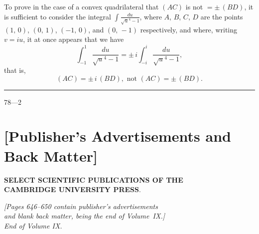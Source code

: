 \documentclass[12pt,a4paper]{article}
\begin{document}
To prove in the case of a convex quadrilateral that $(AC)$ is not $= \pm\,(BD)$, it is sufficient to consider the integral $\displaystyle\int\!\frac{du}{\surd u^4-1}$, where $A$, $B$, $C$, $D$ are the points $(1,\,0)$, $(0,\,1)$, $(-1,\,0)$, and $(0,\,-1)$ respectively, and where, writing $v = iu$, it at once appears that we have
\[
\int_{-1}^{1}\frac{du}{\surd u^4-1} = \pm\,i\int_{-i}^{i}\frac{du}{\surd u^4-1},
\]
that is,
\[
(AC) = \pm\,i\,(BD), \text{ not } (AC) = \pm\,(BD).
\]

\vspace{1ex}
\noindent\rule{2em}{0.4pt}\hfill 78---2
\newpage

\section*{[Publisher's Advertisements and Back Matter]}

\begin{center}
\textbf{SELECT SCIENTIFIC PUBLICATIONS OF THE}\\[4pt]
\textbf{CAMBRIDGE UNIVERSITY PRESS}.
\end{center}

\medskip
\begin{center}
\textit{[Pages 646--650 contain publisher's advertisements}\\
\textit{and blank back matter, being the end of Volume~IX.]}\\[8pt]
\textit{End of Volume IX.}
\end{center}
\end{document}
